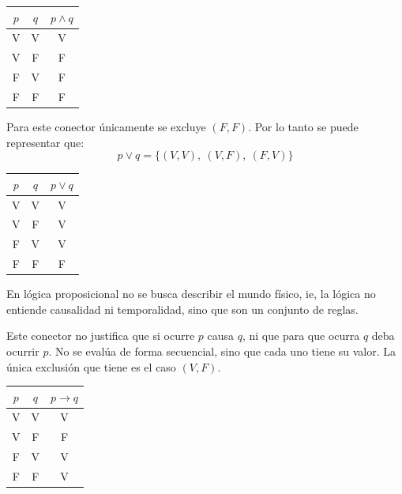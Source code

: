 \documentclass{book}
\begin{document}
  \begin{minipage}{0.35\textwidth}
    \begin{tabular}{c|c|c}
      $p$ & $q$ & $p \land q$ \\
      \hline
      V & V & V \\
      V & F & F \\
      F & V & F \\
      F & F & F \\
    \end{tabular}
  \end{minipage}
  
  \begin{minipage}{0.55\textwidth}
    \begin{definition}[title=Disyunción]
      Para este conector únicamente se excluye $(F, F)$. Por lo tanto se puede representar que:
      \begin{equation}
        p \lor q = \{(V,V),\ (V,F),\ (F,V)\}
      \end{equation}
    \end{definition}
  \end{minipage}

  \begin{minipage}{0.35\textwidth}
    \begin{tabular}{c|c|c}
      $p$ & $q$ & $p \lor q$ \\
      \hline
      V & V & V \\
      V & F & V \\
      F & V & V \\
      F & F & F \\
    \end{tabular}
  \end{minipage}
  
  En lógica proposicional no se busca describir el mundo físico, ie, la lógica no entiende
  causalidad ni temporalidad, sino que son un conjunto de reglas.
  
  \begin{definition}[title=Implicación]
    Este conector no justifica que si ocurre $p$ causa $q$, ni que para que ocurra $q$ deba
    ocurrir $p$. No se evalúa de forma secuencial, sino que cada uno tiene su valor.
    La única exclusión que tiene es el caso $(V, F)$.
  \end{definition}

  \begin{tabular}{c|c|c}
    $p$ & $q$ & $p \to q$ \\
    \hline
    V & V & V \\
    V & F & F \\
    F & V & V \\
    F & F & V \\
  \end{tabular}
\end{document}
